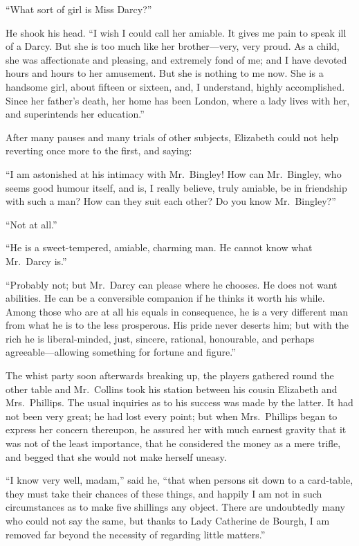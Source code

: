 \documentclass[12pt,english,oneside]{book}
\begin{document}
{}``What sort of girl is Miss Darcy?''\ 

He shook his head. {}``I wish I could call her amiable. It gives
me pain to speak ill of a Darcy. But she is too much like her brother\mbox{---}very,
very proud. As a child, she was affectionate and pleasing, and extremely
fond of me; and I have devoted hours and hours to her amusement. But
she is nothing to me now. She is a handsome girl, about fifteen or
sixteen, and, I understand, highly accomplished. Since her father's
death, her home has been London, where a lady lives with her, and
superintends her education.''

After many pauses and many trials of other subjects, Elizabeth could
not help reverting once more to the first, and saying:

{}``I am astonished at his intimacy with Mr.\ Bingley! How can Mr.\
Bingley, who seems good humour itself, and is, I really believe, truly
amiable, be in friendship with such a man? How can they suit each
other? Do you know Mr.\ Bingley?''\ 

{}``Not at all.''

{}``He is a sweet-tempered, amiable, charming man. He cannot know
what Mr.\ Darcy is.''

{}``Probably not; but Mr.\ Darcy can please where he chooses. He
does not want abilities. He can be a conversible companion if he thinks
it worth his while. Among those who are at all his equals in consequence,
he is a very different man from what he is to the less prosperous.
His pride never deserts him; but with the rich he is liberal-minded,
just, sincere, rational, honourable, and perhaps agreeable\mbox{---}allowing
something for fortune and figure.''

The whist party soon afterwards breaking up, the players gathered
round the other table and Mr.\ Collins took his station between his
cousin Elizabeth and Mrs.\ Phillips. The usual inquiries as to his
success was made by the latter. It had not been very great; he had
lost every point; but when Mrs.\ Phillips began to express her concern
thereupon, he assured her with much earnest gravity that it was not
of the least importance, that he considered the money as a mere trifle,
and begged that she would not make herself uneasy.

{}``I know very well, madam,'' said he, {}``that when persons sit
down to a card-table, they must take their chances of these things,
and happily I am not in such circumstances as to make five shillings
any object. There are undoubtedly many who could not say the same,
but thanks to Lady Catherine de Bourgh, I am removed far beyond the
necessity of regarding little matters.''
\end{document}
